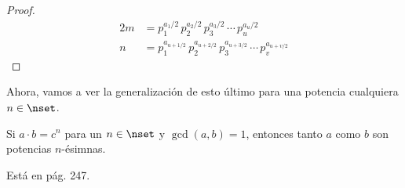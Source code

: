 \begin{proof}
  \begin{alignat*}{2}
    m &= p_1^{a_1/2} \, p_2^{a_2/2} \, p_3^{a_3/2} \, \cdots \, p_u^{a_u/2} \\
    n &= p_1^{a_{u+1/2}} \, p_2^{a_{u+2/2}} \, p_3^{a_{u+3/2}} \, \cdots \,
      p_v^{a_{u+v/2}}
  \end{alignat*}

  \iffalse
  \noindent se tendrá la descomposición, no necesariamente canónica, de $a
  \cdot b$ siguiente:

  $$ c^2 = a \cdot b = p_1^{l_1} \, p_2^{l_2} \, p_3^{l_3} \, \cdots \,
  p_n^{l_n} \, q_1^{k_1} \, q_2^{k_2} \, q_3^{k_3} \, \cdots \, q_m^{k_m} $$

  Si se diese para algún par de esos factores $p_i, q_j$ que $p_i = q_j$,
  esto podría provocar que algún exponente en la descomposición canónica de
  $a \cdot b$ fuese impar, pero esto es imposible ya que $a$ y $b$ son
  primos relativos, con lo que para todos los índices $i, j \in \nset$ con
  $1 \leq i \leq n$ y $1 \leq j \leq m$ se tiene $p_i \neq q_j$. Por tanto,
  esa será su descomposición canónica.

  Por otro lado, por la proposición anterior TKTK, que $a \cdot b$ sea un
  cuadrado perfecto, una de las condiciones de esta proposición, es lo mismo
  que decir que su descomposición canónica en factores primos tenga todos
  sus exponentes pares. Por tanto, en la anterior expresión de $a \cdot b$
  todos los exponentes que aparecen serán pares. Concretamente, serán pares
  todos los exponentes de la descomposición de $a$ y los de la de $b$. Así,
  pues, aplicando otra vez el teorema anterior TKTK, tendremos que tanto $a$
  como $b$ serán cuadrados perfectos.
  \fi
\end{proof}

Ahora, vamos a ver la generalización de esto último para una potencia
cualquiera $n \in \nset$.

\begin{proposition}
  Si $a \cdot b = c^n$ para un $n \in \nset$ y $\gcd(a, b) = 1$, entonces
  tanto $a$ como $b$ son potencias $n$-ésimnas.
\end{proposition}

Está en \cite{burton} pág. 247.

